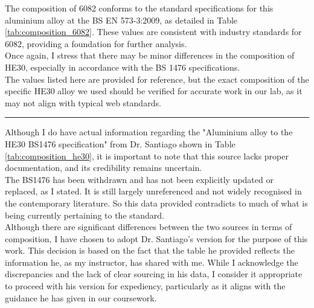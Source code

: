 \documentclass{article}
\begin{document}
\begin{minipage}{0.53\textwidth}
    The composition of 6082 conforms to the standard specifications for this aluminium alloy at the BS EN 573-3:2009, as detailed in Table \ref{tab:composition_6082}. These values are consistent with industry standards for 6082, providing a foundation for further analysis.\\[8pt]
    Once again, I stress that there may be minor differences in the composition of HE30, especially in accordance with the BS 1476 specifications.\\[8pt] 
    The values listed here are provided for reference, but the exact composition of the specific HE30 alloy we used should be verified for accurate work in our lab, as it may not align with typical web standards.
    \vspace{1em}\hrule\vspace{1em}
    Although I do have actual information regarding the "Aluminium alloy to the HE30 BS1476 specification" from Dr. Santiago shown in Table \ref{tab:composition_he30}, it is important to note that this source lacks proper documentation, and its credibility remains uncertain.\\[8pt]
    The BS1476 has been withdrawn and has not been explicitly updated or replaced, as I stated. It is still largely unreferenced and not widely recognised in the contemporary literature. So this data provided contradicts to much of what is being currently pertaining to the standard.\\[8pt]
    Although there are significant differences between the two sources in terms of composition, I have chosen to adopt Dr. Santiago's version for the purpose of this work. This decision is based on the fact that the table he provided reflects the information he, as my instructor, has shared with me. While I acknowledge the discrepancies and the lack of clear sourcing in his data, I consider it appropriate to proceed with his version for expediency, particularly as it aligns with the guidance he has given in our coursework.
\end{minipage}\\

\raggedright
\end{document}
